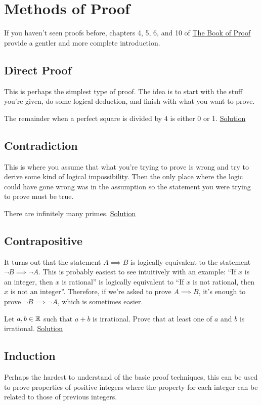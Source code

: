 \section{Methods of Proof}
If you haven't seen proofs before, chapters 4, 5, 6, and 10 of
\href{https://www.people.vcu.edu/~rhammack/BookOfProof/Main.pdf}{The Book of
  Proof} provide a gentler and more complete introduction.
\subsection{Direct Proof}
This is perhaps the simplest type of proof. The idea is to start with the stuff
you're given, do some logical deduction, and finish with what you want to prove.
\begin{result}\label{r:b:m:1:1}
  The remainder when a perfect square is divided by 4 is either 0 or 1.
  \hyperlink{s:m:1:1}{Solution}
\end{result}
\subsection{Contradiction}
This is where you assume that what you're trying to prove is wrong and try to
derive some kind of logical impossibility. Then the only place where the logic
could have gone wrong was in the assumption so the statement you were trying to
prove must be true.
\begin{result}\label{r:b:m:2:1}
  There are infinitely many primes.
  \hyperlink{s:m:2:1}{Solution}
\end{result}
\subsection{Contrapositive}
It turns out that the statement $A\implies B$ is logically equivalent to the
statement $\neg B\implies\neg A$. This is probably easiest to see intuitively
with an example: ``If $x$ is an integer, then $x$ is rational'' is
logically equivalent to ``If $x$ is not rational, then $x$ is not an integer''.
Therefore, if we're asked to prove $A\implies B$, it's enough to
prove $\neg B\implies\neg A$, which is sometimes easier.
\begin{problem}\label{p:b:m:3:1}
  Let $a,b\in\mathbb{R}$ such that $a+b$ is irrational. Prove that at least one of $a$
  and $b$ is irrational.
  \hyperlink{s:m:3:1}{Solution}
\end{problem}
\subsection{Induction}
Perhaps the hardest to understand of the basic proof techniques, this can be
used to prove properties of positive integers where the property for each
integer can be related to those of previous integers.

